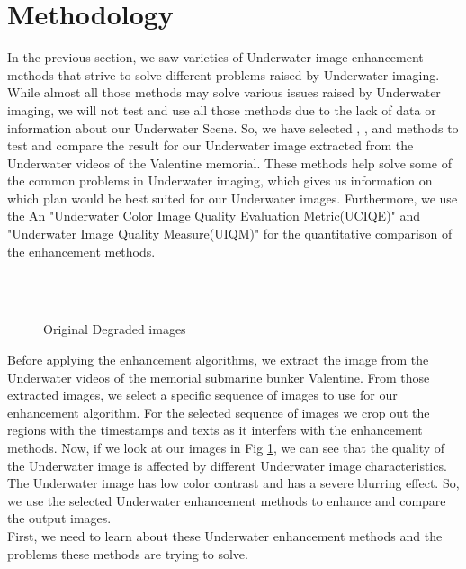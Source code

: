 \documentclass[a4paper,11pt,oneside]{article}
\begin{document}
  \section{Methodology}
  \label{sec:3}
  In the previous section, we saw varieties of Underwater image enhancement methods that strive to solve different problems raised by Underwater imaging. While almost all those methods may solve various issues raised by Underwater imaging, we will not test and use all those methods due to the lack of data or information about our Underwater Scene. So, we have selected \cite{4}, \cite{8}, \cite{26} and \cite{16} methods to test and compare the result for our Underwater image extracted from the Underwater videos of the Valentine memorial. These methods help solve some of the common problems in Underwater imaging, which gives us information on which plan would be best suited for our Underwater images. Furthermore, we use the An "Underwater Color Image Quality Evaluation Metric(UCIQE)" \cite{18} and "Underwater Image Quality Measure(UIQM)" \cite{29} for the quantitative comparison of the enhancement methods.\\
  \\
  \begin{figure}[H]
  \begin{center}
     \\
  \end{center}
  \caption{Original Degraded images}
  \label{fig:1}
\end{figure}
  Before applying the enhancement algorithms, we extract the image from the Underwater videos of the memorial submarine bunker Valentine. From those extracted images, we select a specific sequence of images to use for our enhancement algorithm. For the selected sequence of images we crop out the regions with the timestamps and texts as it interfers with the enhancement methods. Now, if we look at our images in Fig \ref{fig:1}, we can see that the quality of the Underwater image is affected by different Underwater image characteristics. The Underwater image has low color contrast and has a severe blurring effect. So, we use the selected Underwater enhancement methods to enhance and compare the output images.\\
  First, we need to learn about these Underwater enhancement methods and the problems these methods are trying to solve.
\end{document}
